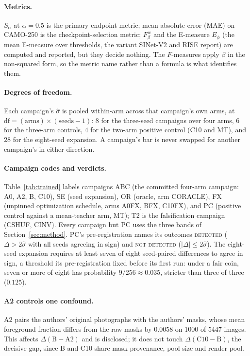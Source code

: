 \documentclass{article}
\begin{document}
\paragraph{Metrics.} $S_\alpha$ at $\alpha = 0.5$ is the primary endpoint metric; mean absolute
error (MAE) on CAMO-250 is the checkpoint-selection metric; $F_\beta^w$ and the E-measure $E_\phi$
(the mean E-measure over thresholds, the variant SINet-V2 and RISE report) are computed and reported, but they decide
nothing.
The $F$-measures apply $\beta$ in the non-squared form, so the metric name rather than a formula is what identifies them.

\paragraph{Degrees of freedom.} Each campaign's $\hat{\sigma}$ is pooled within-arm across that
campaign's own arms, at $\mathrm{df} = (\text{arms}) \times (\text{seeds} - 1)$: $8$ for the
three-seed campaigns over four arms, $6$ for the three-arm controls, $4$ for the two-arm positive
control (C10 and MT), and $28$ for the eight-seed expansion. A campaign's bar is never swapped for another campaign's in either direction.

\paragraph{Campaign codes and verdicts.} Table~\ref{tab:trained} labels campaigns ABC (the committed
four-arm campaign: A0, A2, B, C10), SE (seed expansion), OR (oracle, arm CORACLE), FX (unpinned
optimization schedule, arms A0FX, BFX, C10FX), and PC (positive control against a mean-teacher arm,
MT); T2 is the falsification campaign (CSHUF, CINV). Every campaign but PC uses the three bands of
Section~\ref{sec:method}. PC's pre-registration names its outcomes \textsc{detected} ($\Delta > 2\hat{\sigma}$
with all seeds agreeing in sign) and \textsc{not detected} ($|\Delta| \le 2\hat{\sigma}$). The eight-seed expansion
requires at least seven of eight seed-paired differences to agree in sign, a threshold its pre-registration fixed
before its first run: under a fair coin, seven or more of eight has probability $9/256 \approx 0.035$, stricter than
three of three ($0.125$).

\paragraph{A2 controls one confound.} A2 pairs the authors' original photographs with the
authors' masks, whose mean foreground fraction differs from the raw masks by $0.0058$ on $1000$ of
$5447$ images. This affects $\Delta(\mathrm{B}-\mathrm{A2})$ and is disclosed; it does not touch
$\Delta(\mathrm{C10}-\mathrm{B})$, the decisive gap, since B and C10 share mask provenance, pool
size and render pool.
\end{document}

